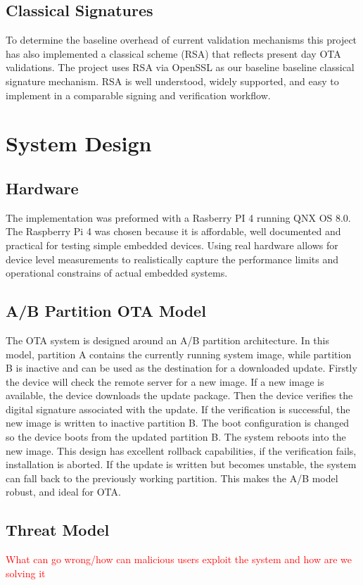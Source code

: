 \documentclass[12pt]{article}
\begin{document}
\subsection{Classical Signatures}
To determine the baseline overhead of current validation mechanisms this project has also implemented a classical scheme (RSA) that reflects present day OTA validations. The project uses RSA via OpenSSL as our baseline  baseline classical signature mechanism. RSA is well understood, widely supported, and easy to implement in a comparable signing and verification workflow. 
\section{System Design}
\subsection{Hardware}
The implementation was preformed with a Rasberry PI 4 running QNX OS 8.0. The Raspberry Pi 4 was chosen because it is affordable, well documented and practical for testing simple embedded devices. Using real hardware allows for device level measurements to realistically capture the performance limits and operational constrains of actual embedded systems.  
\subsection{A/B Partition OTA Model}
The OTA system is designed around an A/B partition architecture. In this model,
partition A contains the currently running system image, while partition B is inactive and can
be used as the destination for a downloaded update. Firstly the device will check the remote server for a new image. If a new image is available, the device downloads the update package. Then the device verifies the digital signature associated with the update. If the verification is successful, the new image is written to inactive partition B. The boot configuration is changed so the device boots from the updated partition B. The system reboots into the new image. This design has excellent rollback capabilities, if the verification fails, installation is aborted. If the update is written but becomes unstable, the system can fall back to the previously working partition. This makes the A/B model robust, and ideal for OTA. 
\subsection{Threat Model}
\textcolor{red}{What can go wrong/how can malicious users exploit the system and how are we solving it}
\end{document}
